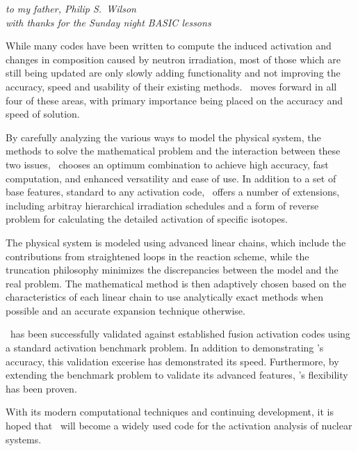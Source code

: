 
\maketitle

\newpage


\begin{center}
  \textsl{to my father, Philip S.~Wilson\\
with thanks for the Sunday night BASIC lessons}
\end{center}


\newpage

\begin{myabstract}
  
  While many codes have been written to compute the induced activation
  and changes in composition caused by neutron irradiation, most of
  those which are still being updated are only slowly adding
  functionality and not improving the accuracy, speed and usability of
  their existing methods.  \ALARA\ moves forward in all four of these
  areas, with primary importance being placed on the accuracy and
  speed of solution.
  
  By carefully analyzing the various ways to model the physical
  system, the methods to solve the mathematical problem and the
  interaction between these two issues, \ALARA\ chooses an optimum
  combination to achieve high accuracy, fast computation, and enhanced
  versatility and ease of use.  In addition to a set of base features,
  standard to any activation code, \ALARA\ offers a number of
  extensions, including arbitray hierarchical irradiation schedules
  and a form of reverse problem for calculating the detailed
  activation of specific isotopes.
  
  The physical system is modeled using advanced linear chains, which
  include the contributions from straightened loops in the reaction
  scheme, while the truncation philosophy minimizes the discrepancies
  between the model and the real problem.  The mathematical method is
  then adaptively chosen based on the characteristics of each linear
  chain to use analytically exact methods when possible and an
  accurate expansion technique otherwise.
  
  \ALARA\ has been successfully validated against established fusion
  activation codes using a standard activation benchmark problem.  In
  addition to demonstrating \ALARA's accuracy, this validation
  excerise has demonstrated its speed.  Furthermore, by extending the
  benchmark problem to validate its advanced features, \ALARA's
  flexibility has been proven.
  
  With its modern computational techniques and continuing development,
  it is hoped that \ALARA\ will become a widely used code for the
  activation analysis of nuclear systems.


\end{myabstract}

\tableofcontents

\listoffigures

\listoftables









